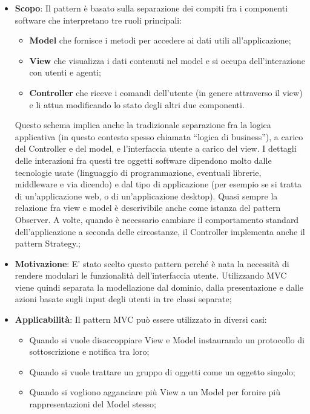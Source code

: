 		\begin{itemize}
			\item \textbf{Scopo}: Il pattern è basato sulla separazione dei compiti fra i componenti software che interpretano tre ruoli principali:

		\begin{itemize}
			\item \textbf{Model} che fornisce i metodi per accedere ai dati utili all'applicazione;
			\item \textbf{View} che visualizza i dati contenuti nel model e si occupa dell'interazione con utenti e agenti;
			\item \textbf{Controller} che riceve i comandi dell'utente (in genere attraverso il view) e li attua modificando lo stato degli altri due componenti.
		\end{itemize}

		\noindent
		Questo schema implica anche la tradizionale separazione fra la logica applicativa (in questo contesto spesso chiamata ``logica di business''), a carico del Controller e del model, e l'interfaccia utente a carico del view. I dettagli delle interazioni fra questi tre oggetti software dipendono molto dalle tecnologie usate (linguaggio di programmazione, eventuali librerie, middleware e via dicendo) e dal tipo di applicazione (per esempio se si tratta di un'applicazione web, o di un'applicazione desktop). Quasi sempre la relazione fra view e model è descrivibile anche come istanza del pattern Observer. A volte, quando è necessario cambiare il comportamento standard dell'applicazione a seconda delle circostanze, il Controller implementa anche il pattern Strategy.;

			\item \textbf{Motivazione}: E' stato scelto questo pattern perché è nata la necessità di rendere modulari le funzionalità dell'interfaccia utente. Utilizzando MVC viene quindi separata la modellazione dal dominio, dalla presentazione e dalle azioni basate sugli input degli utenti in tre classi separate;

			\item \textbf{Applicabilità}: Il pattern MVC può essere utilizzato in diversi casi:

			\begin{itemize}
			\item  Quando si vuole disaccoppiare View e Model instaurando un protocollo di sottoscrizione e notifica tra loro;
			\item Quando si vuole trattare un gruppo di oggetti come un oggetto singolo;
			\item Quando si vogliono agganciare più View a un Model per fornire più rappresentazioni del Model stesso;
			\end{itemize}

		\end{itemize}


